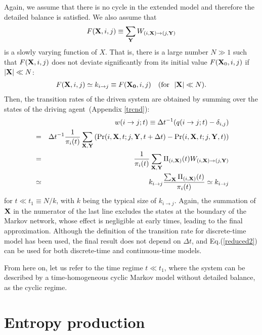 \documentclass[aps,pre,amsmath,amssymb,floatfix,preprint,nofootinbib]{revtex4}
\begin{document}
  Again, we assume that there is no cycle in the extended model and therefore the detailed balance is satisfied.  We also assume that
\begin{eqnarray}
F({\bf X},i,j) \equiv \sum_{\bf Y} W_{(i,{\bf X}) \to (j,{\bf Y})}   
\end{eqnarray}
is a slowly varying function of $X$. That is, there is a large number $N \gg 1$ such that $F({\bf X},i,j)$ does not deviate significantly from its initial value $F({\bf X}_0,i,j)$ if $|{\bf X}| \ll N$:
\begin{eqnarray}
F({\bf X},i,j) \simeq k_{i \to j} \equiv F({\bf X_0},i,j)  \quad ({\rm for}\ \ |{\bf X}| \ll N). \label{simp2}
\end{eqnarray}
 Then, the transition rates of the driven system are obtained by summing over the states of the driving agent~(Appendix \ref{trcnd}):
\begin{eqnarray}
&&w(i \to j; t) \equiv \Delta t^{-1}(q(i \to j; t) - \delta_{i,j} ) \nonumber\\
&=& \Delta t^{-1} \frac{1}{\pi_i(t)} \sum_{{\bf X},{\bf Y}}\left( {\rm Pr}(i,{\bf X},t; j,{\bf Y},t + \Delta t) - {\rm Pr}(i,{\bf X},t; j,{\bf Y},t) \right)\nonumber\\
&=& \frac{1}{\pi_i(t)}\sum_{{\bf X},{\bf Y}} \Pi_{(i,{\bf X})}(t) W_{(i,{\bf X}) \to (j,{\bf Y})}
\nonumber\\
&\simeq& k_{i \to j} \frac{\sum_{{\bf X}} \Pi_{(i,{\bf X})}(t)}{\pi_i(t)}  \simeq	k_{i \to j}
	 \label{reduced2}
\end{eqnarray}
for $t \ll  t_1 \equiv N/k$, with $k$  being the typical size of $k_{i \to j}$. Again, the summation of ${\bf X}$ in the numerator of the last line excludes the states at the boundary of the Markov network, whose effect is negligible at early times, leading to the final approximation. Although the definition of the transition rate for discrete-time model has been used, the final result does not depend on $\Delta t$, and Eq.(\ref{reduced2}) can be used for both discrete-time and continuous-time models.
 

From here on, let us refer to the time regime $t \ll t_1$, where the system can be described by a time-homogeneous cyclic Markov model without detailed balance, as the cyclic regime. 


\section{Entropy production}
\end{document}
